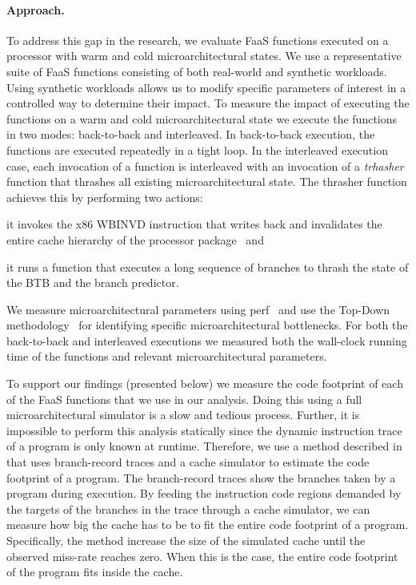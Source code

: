 \documentclass[../main.tex]{subfiles}
\begin{document}
\begin{refsection}
\paragraph{Approach.}
To address this gap in the research, we evaluate FaaS functions
executed on a processor with warm and cold microarchitectural
states. We use a representative suite of FaaS functions consisting of
both real-world and synthetic workloads. Using synthetic workloads
allows us to modify specific parameters of interest in a controlled
way to determine their impact. To measure the impact of executing the
functions on a warm and cold microarchitectural state we execute the
functions in two modes: back-to-back and interleaved. In back-to-back
execution, the functions are executed repeatedly in a tight loop. In
the interleaved execution case, each invocation of a function is
interleaved with an invocation of a \emph{trhasher} function that
thrashes all existing microarchitectural state. The thrasher function
achieves this by performing two actions: \begin{inparaenum}[1)]
\item it invokes the x86 WBINVD
  instruction that writes back and invalidates the entire cache
  hierarchy of the processor package~\cite[Chapter 6]{intelmanual} and \item it runs a function that
  executes a long sequence of branches to thrash the state of
  the BTB and the branch predictor. \end{inparaenum} We measure
microarchitectural parameters using perf~\cite{perftool} and use the Top-Down
methodology~\cite{yasin14_top_down} for identifying specific
microarchitectural bottlenecks. For both the back-to-back and
interleaved executions we measured both the wall-clock running time of
the functions and relevant microarchitectural parameters.


To support our findings (presented below) we measure the code
footprint of each of the FaaS functions that we use in our
analysis. Doing this using a full microarchitectural simulator is a
slow and tedious process. Further, it is impossible to perform this
analysis statically since the dynamic instruction trace of a program
is only known at runtime. Therefore, we use a method described
in~\cite{splash2} that uses branch-record traces and a cache simulator
to estimate the code footprint of a program. The branch-record traces
show the branches taken by a program during execution. By feeding the
instruction code regions demanded by the targets of the branches in
the trace through a cache simulator, we can measure how big the cache
has to be to fit the entire code footprint of a program.
Specifically, the method increase the size of the simulated cache
until the observed miss-rate reaches zero. When this is the case, the
entire code footprint of the program fits inside the cache.



\end{refsection}
\end{document}
